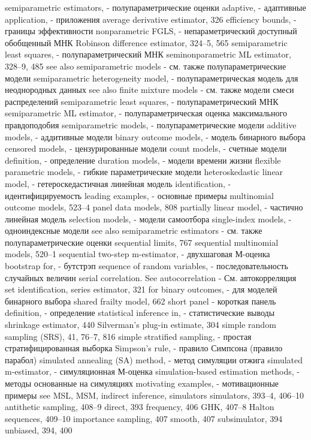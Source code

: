 semiparametric estimators, - полупараметрические оценки
adaptive, - адаптивные
application, - приложения
average derivative estimator, 326
efficiency bounds, - границы эффективности
nonparametric FGLS, - непараметрический доступный обобщенный МНК
Robinson difference estimator, 324–5, 565 
semiparametric least squares, - полупараметрический МНК
seminonparametric ML estimator, 328–9, 485 
see also semiparametric models - см. также полупараметрические модели
semiparametric heterogeneity model, - полупараметрическая модель для неоднородных данных
see also finite mixture models - см. также модели смеси распределений
semiparametric least squares, - полупараметрический МНК
semiparametric ML estimator, - полупараметрическая оценка максимального правдоподобия
semiparametric models, - полупараметрические модели
additive models, - аддитивные модели
binary outcome models, - модель бинарного выбора
censored models, - цензурированные модели
count models, - счетные модели
definition, - определение
duration models, - модели времени жизни
flexible parametric models, - гибкие параметрические модели 
heteroskedastic linear model, - гетероскедастичная линейная модель
identification, - идентифицируемость
leading examples, - основные примеры
multinomial outcome models, 523–4 panel data models, 808
partially linear model, - частично линейная модель
selection models, - модели самоотбора
single-index models, - одноиндексные модели
see also semiparametric estimators - см. также полупараметрические оценки
sequential limits, 767
sequential multinomial models, 520–1 
sequential two-step m-estimator, - двухшаговая М-оценка
bootstrap for, - бутстрэп
sequence of random variables, - последовательность случайных величин
serial correlation. See autocorrelation - См. автокорреляция
set identification, 
series estimator, 321
for binary outcomes, - для моделей бинарного выбора
shared frailty model, 662 
short panel - короткая панель
definition, - определение
statistical inference in, - статистические выводы 
shrinkage estimator, 440
Silverman’s plug-in estimate, 304
simple random sampling (SRS), 41, 76–7, 816
simple stratified sampling, - простая стратифицированная выборка
Simpson’s rule, - правило Симпсона (правило парабол)
simulated annealing (SA) method, - метод симуляции отжига
simulated m-estimator, - симуляционная М-оценка
simulation-based estimation methods, - методы основанные на симуляциях
motivating examples, - мотивационные примеры
see MSL, MSM, indirect inference, simulators simulators, 393–4, 406–10
antithetic sampling, 408–9 
direct, 393
frequency, 406
GHK, 407–8
Halton sequences, 409–10 importance sampling, 407 smooth, 407 subsimulator, 394 unbiased, 394, 400
